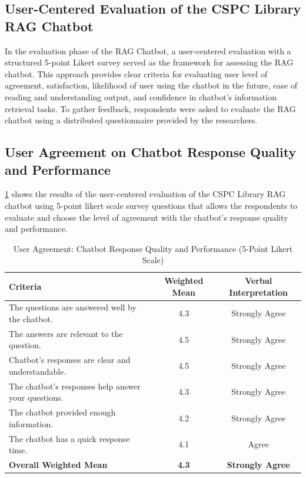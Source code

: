 \begin{refsection}
\section*{User-Centered Evaluation of the CSPC Library RAG Chatbot}
In the evaluation phase of the RAG Chatbot, a user-centered evaluation with a structured 5-point Likert survey served as the framework for assessing the RAG chatbot. This approach provides clear criteria for evaluating user level of agreement, satisfaction, likelihood of user using the chatbot in the future, ease of reading and understanding output, and confidence in chatbot’s information retrieval tasks. To gather feedback, respondents were asked to evaluate the RAG chatbot using a distributed questionnaire provided by the researchers.

\subsection{User Agreement on Chatbot Response Quality and Performance}
\ref{tab:user_agreement_quality} shows the results of the user-centered evaluation of the CSPC Library RAG chatbot using 5-point likert scale survey questions that allows the respondents to evaluate and choose the level of agreement with the chatbot’s response quality and performance.

\begin{table}[H]
    \centering
    \caption{User Agreement: Chatbot Response Quality and Performance (5-Point Likert Scale)}
    \label{tab:user_agreement_quality}
    \begin{tabular}{p{7cm} c c}
        \hline
        \textbf{Criteria} & \textbf{Weighted Mean} & \textbf{Verbal Interpretation} \\
        \hline
        The questions are answered well by the chatbot. & 4.3 & Strongly Agree \\
        \hline
        The answers are relevant to the question. & 4.5 & Strongly Agree \\
        \hline
        Chatbot’s responses are clear and understandable. & 4.5 & Strongly Agree \\
        \hline
        The chatbot’s responses help answer your questions. & 4.3 & Strongly Agree \\
        \hline
        The chatbot provided enough information. & 4.2 & Strongly Agree \\
        \hline
        The chatbot has a quick response time. & 4.1 & Agree \\
        \hline
        \textbf{Overall Weighted Mean} & \textbf{4.3} & \textbf{Strongly Agree} \\
    \end{tabular}
\end{table}


\end{refsection}
